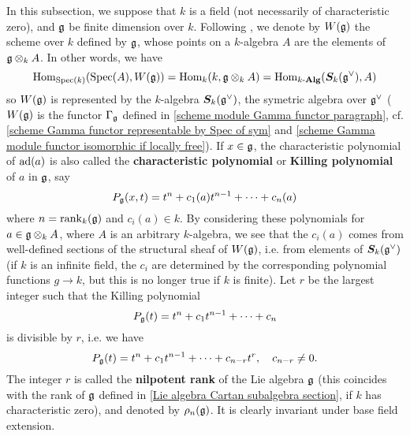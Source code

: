 In this subsection, we suppose that $k$ is a field (not necessarily of characteristic zero), and $\mathfrak{g}$ be finite dimension over $k$. Following \cite{SGA3-2}, we denote by $W(\mathfrak{g})$ the scheme over $k$ defined by $\mathfrak{g}$, whose points on a $k$-algebra $A$ are the elements of $\mathfrak{g}\otimes_kA$. In other words, we have
\[\mathrm{Hom}_{\mathrm{Spec}(k)}(\mathrm{Spec}(A),W(\mathfrak{g}))=\mathrm{Hom}_k(k,\mathfrak{g}\otimes_kA)=\mathrm{Hom}_{k\textup{-}\mathbf{Alg}}(\bm{S}_k(\mathfrak{g}^\vee),A)\]
so $W(\mathfrak{g})$ is represented by the $k$-algebra $\bm{S}_k(\mathfrak{g}^\vee)$, the symetric algebra over $\mathfrak{g}^\vee$ ($W(\mathfrak{g})$ is the functor $\Gamma_{\mathfrak{g}}$ defined in \ref{scheme module Gamma functor paragraph}, cf. \cref{scheme Gamma functor representable by Spec of sym} and \cref{scheme Gamma module functor isomorphic if locally free}). If $x\in\mathfrak{g}$, the characteristic polynomial of $\mathrm{ad}(a)$ is also called the \textbf{characteristic polynomial} or \textbf{Killing polynomial} of $a$ in $\mathfrak{g}$, say
\[P_{\mathfrak{g}}(x,t)=t^n+c_1(a)t^{n-1}+\cdots+c_n(a)\]
where $n=\mathrm{rank}_k(\mathfrak{g})$ and $c_i(a)\in k$. By considering these polynomials for $a\in\mathfrak{g}\otimes_kA$, where $A$ is an arbitrary $k$-algebra, we see that the $c_i(a)$ comes from well-defined sections of the structural sheaf of $W(\mathfrak{g})$, i.e. from elements of $\bm{S}_k(\mathfrak{g}^\vee)$ (if $k$ is an infinite field, the $c_i$ are determined by the corresponding polynomial functions $g\to k$, but this is no longer true if $k$ is finite). Let $r$ be the largest integer such that the Killing polynomial
\[P_{\mathfrak{g}}(t)=t^n+c_1t^{n-1}+\cdots+c_n\]
is divisible by $r$, i.e. we have
\[P_{\mathfrak{g}}(t)=t^n+c_1t^{n-1}+\cdots+c_{n-r}t^r,\quad c_{n-r}\neq 0.\]
The integer $r$ is called the \textbf{nilpotent rank} of the Lie algebra $\mathfrak{g}$ (this coincides with the rank of $\mathfrak{g}$ defined in \autoref{Lie algebra Cartan subalgebra section}, if $k$ has characteristic zero), and denoted by $\rho_n(\mathfrak{g})$. It is clearly invariant under base field extension.

